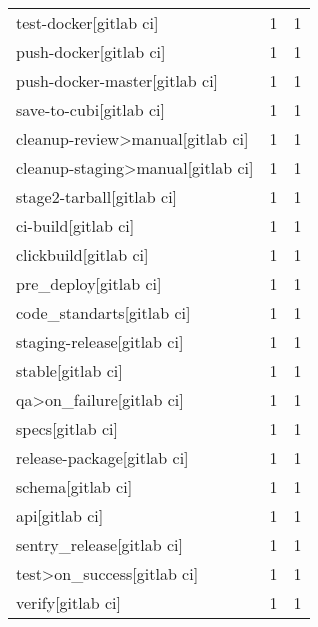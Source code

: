 \begin{tabular}{lrr}
test-docker[gitlab ci]                     &                   1 &             1 \\
push-docker[gitlab ci]                     &                   1 &             1 \\
push-docker-master[gitlab ci]              &                   1 &             1 \\
save-to-cubi[gitlab ci]                    &                   1 &             1 \\
cleanup-review>manual[gitlab ci]           &                   1 &             1 \\
cleanup-staging>manual[gitlab ci]          &                   1 &             1 \\
stage2-tarball[gitlab ci]                  &                   1 &             1 \\
ci-build[gitlab ci]                        &                   1 &             1 \\
clickbuild[gitlab ci]                      &                   1 &             1 \\
pre\_deploy[gitlab ci]                      &                   1 &             1 \\
code\_standarts[gitlab ci]                  &                   1 &             1 \\
staging-release[gitlab ci]                 &                   1 &             1 \\
stable[gitlab ci]                          &                   1 &             1 \\
qa>on\_failure[gitlab ci]                   &                   1 &             1 \\
specs[gitlab ci]                           &                   1 &             1 \\
release-package[gitlab ci]                 &                   1 &             1 \\
schema[gitlab ci]                          &                   1 &             1 \\
api[gitlab ci]                             &                   1 &             1 \\
sentry\_release[gitlab ci]                  &                   1 &             1 \\
test>on\_success[gitlab ci]                 &                   1 &             1 \\
verify[gitlab ci]                          &                   1 &             1 \\

\end{tabular}
